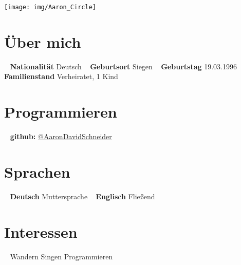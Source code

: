 \documentclass[]{friggeri-cv}
\begin{document}



\begin{aside}
  \texttt{[image: img/Aaron\_Circle]}
\section{Über mich}
~  
\textbf{Nationalität}
  Deutsch
   ~
  \textbf{Geburtsort}
  Siegen
  ~
  \textbf{Geburtstag}
  19.03.1996
  ~  
  \textbf{Familienstand}
  Verheiratet, 1 Kind
  \section{Programmieren}
  ~
    \textbf{github:} 
    \href{https://github.com/AaronDavidSchneider/}{@AaronDavidSchneider}
     \section{Sprachen}
	  ~
    \textbf{Deutsch}
    Muttersprache
    ~
    \textbf{Englisch}
    Fließend
 \section{Interessen}
 ~
 Wandern
 Singen
 Programmieren
\end{aside}
\end{document}

